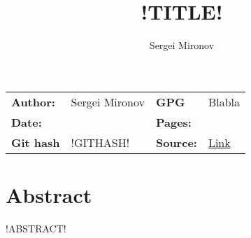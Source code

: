 \documentclass{article}
\title{!TITLE!}
\author{Sergei Mironov}
\begin{document}
\begin{center}
\begin{tabular}{L{2cm} R{4cm} | L{2cm} R{4cm}}
\textbf{Author:} & Sergei Mironov & \textbf{GPG} & Blabla \\
\textbf{Date:} & \localdate{\today} & \textbf{Pages:} & \pageref{LastPage} \\
\textbf{Git hash} & !GITHASH! & \textbf{Source:} & \href{https://github.com/sergei-mironov/technotes/blob/main/tex/!BODYFILE!}{Link} \\
\end{tabular}
\end{center}

\vsp

\makeatletter
\begin{center}
  \LARGE \bfseries \@title
\end{center}
\makeatother

\section*{Abstract}

!ABSTRACT!

\tableofcontents



\printbibliography
\end{document}
